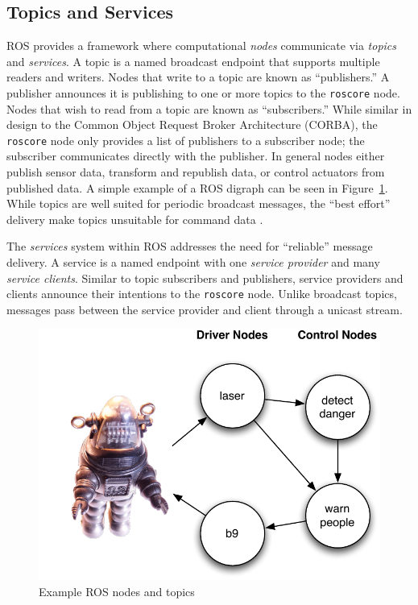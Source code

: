 \subsection{Topics and Services}
\label{sub:ros_net}
ROS provides a framework where computational \emph{nodes} communicate via \emph{topics} and \emph{services}. A topic is a named broadcast endpoint that supports multiple readers and writers. Nodes that write to a topic are known as ``publishers.'' A publisher announces it is publishing to one or more topics to the \verb!roscore! node. Nodes that wish to read from a topic are known as ``subscribers.'' While similar in design to the Common Object Request Broker Architecture (CORBA), the \verb!roscore! node only provides a list of publishers to a subscriber node; the subscriber communicates directly with the publisher. In general nodes either publish sensor data, transform and republish data, or control actuators from published data. A simple example of a ROS digraph can be seen in Figure~\ref{fig:middleware-ros}. While topics are well suited for periodic broadcast messages, the ``best effort'' delivery make topics unsuitable for command data \cite{ROS09}.

The \emph{services} system within ROS addresses the need for ``reliable'' message delivery. A service is a named endpoint with one \emph{service provider} and many \emph{service clients}.  Similar to topic subscribers and publishers, service providers and clients announce their intentions to the \verb!roscore! node. Unlike broadcast topics, messages pass between the service provider and client through a unicast stream. 

\begin{figure}[ht]
\includegraphics{images/middleware-ros.pdf}
\caption{Example ROS nodes and topics\label{fig:middleware-ros}}
\end{figure}

